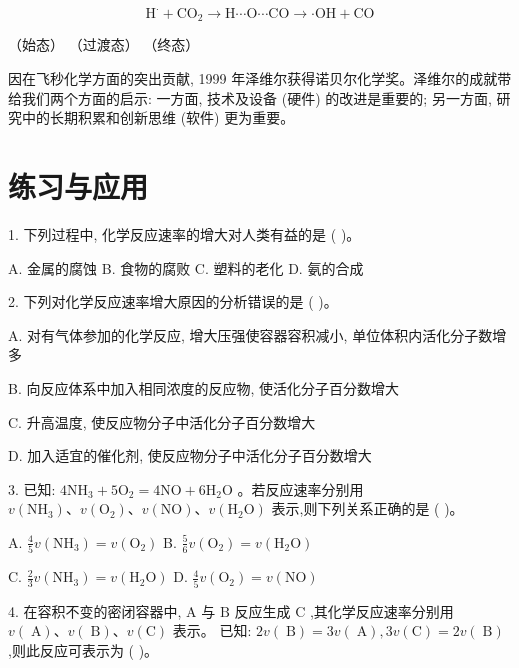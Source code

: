 \documentclass[10pt]{article}
\begin{document}
\[
{\mathrm{H}}^{ \cdot } + {\mathrm{{CO}}}_{2} \rightarrow \mathrm{H}\cdots \mathrm{O}\cdots \mathrm{{CO}} \rightarrow \cdot \mathrm{{OH}} + \mathrm{{CO}}
\]

（始态） （过渡态） （终态）

因在飞秒化学方面的突出贡献, 1999 年泽维尔获得诺贝尔化学奖。泽维尔的成就带给我们两个方面的启示: 一方面, 技术及设备 (硬件) 的改进是重要的; 另一方面, 研究中的长期积累和创新思维 (软件) 更为重要。

\section*{练习与应用}

1. 下列过程中, 化学反应速率的增大对人类有益的是 ( )。

A. 金属的腐蚀 B. 食物的腐败 C. 塑料的老化 D. 氨的合成

2. 下列对化学反应速率增大原因的分析错误的是 ( )。

A. 对有气体参加的化学反应, 增大压强使容器容积减小, 单位体积内活化分子数增多

B. 向反应体系中加入相同浓度的反应物, 使活化分子百分数增大

C. 升高温度, 使反应物分子中活化分子百分数增大

D. 加入适宜的催化剂, 使反应物分子中活化分子百分数增大

3. 已知: \(4{\mathrm{{NH}}}_{3} + 5{\mathrm{O}}_{2} = 4\mathrm{{NO}} + 6{\mathrm{H}}_{2}\mathrm{O}\) 。若反应速率分别用 \(v\left( {\mathrm{{NH}}}_{3}\right) \text{、}v\left( {\mathrm{O}}_{2}\right) \text{、}v\left( \mathrm{{NO}}\right) \text{、}v\left( {{\mathrm{H}}_{2}\mathrm{O}}\right)\) 表示,则下列关系正确的是 ( )。

A. \(\frac{4}{5}v\left( {\mathrm{{NH}}}_{3}\right) = v\left( {\mathrm{O}}_{2}\right)\) B. \(\frac{5}{6}v\left( {\mathrm{O}}_{2}\right) = v\left( {{\mathrm{H}}_{2}\mathrm{O}}\right)\)

C. \(\frac{2}{3}v\left( {\mathrm{{NH}}}_{3}\right) = v\left( {{\mathrm{H}}_{2}\mathrm{O}}\right)\) D. \(\frac{4}{5}v\left( {\mathrm{O}}_{2}\right) = v\left( \mathrm{{NO}}\right)\)

4. 在容积不变的密闭容器中, \(\mathrm{A}\) 与 \(\mathrm{B}\) 反应生成 \(\mathrm{C}\) ,其化学反应速率分别用 \(v\left( \mathrm{\;A}\right) \text{、}v\left( \mathrm{\;B}\right) \text{、}v\left( \mathrm{C}\right)\) 表示。 已知: \({2v}\left( \mathrm{\;B}\right) = {3v}\left( \mathrm{\;A}\right) ,{3v}\left( \mathrm{C}\right) = {2v}\left( \mathrm{\;B}\right)\) ,则此反应可表示为 ( )。
\end{document}
